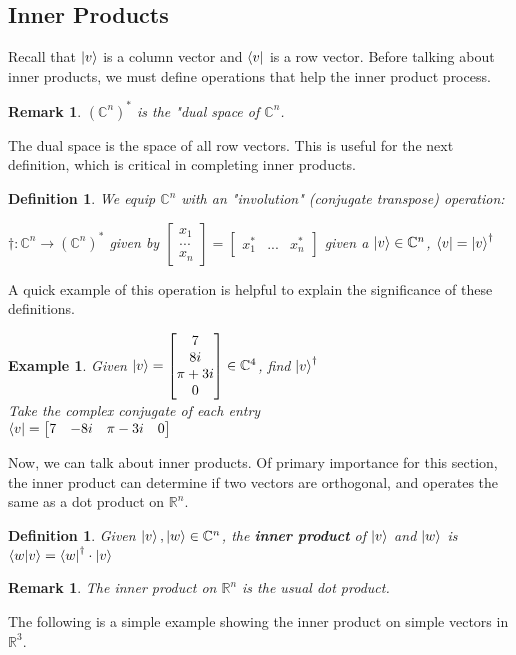 \documentclass[12pt]{article}
\theoremstyle{plain}
\theoremstyle{nonumberplain}
\theoremstyle{plain}
\newtheorem{definition}[lemma]{Definition}
\newtheorem{example}[lemma]{Example}
\newtheorem{remark}[lemma]{Remark}
\theoremstyle{nonumberplain}
\newcommand\1{{\bf 1}}
\newcommand{\bmat}[1]{\begin{bmatrix*} #1 \end{bmatrix*}} %
\newcommand{\R}{\mathbb{R}} %
\newcommand{\C}{\mathbb{C}} %
\newcommand{\<}{\left\langle}
\renewcommand{\>}{\right\rangle}
\begin{document}

\subsection{Inner Products}

Recall that $\ket{v}$ is a column vector and $\bra{v}$ is a row vector. Before talking about inner products, we must define operations that help the inner product process.
\begin{remark}
$(\C^n)^*$ is the "dual space of $\C^n$.
\end{remark}
The dual space is the space of all row vectors. This is useful for the next definition, which is critical in completing inner products.
\begin{definition}
We equip $\C^n$ with an "involution" (\textit{conjugate transpose}) operation:
\begin{center}
$\dagger:\C^n\longrightarrow(\C^n)^*$ given by $\bmat{x_1 \\ ... \\ x_n}=\bmat{x_1^* & ... & x_n^*}$ given a $\ket{v}\in\C^n$, $\bra{v}=\ket{v}^\dagger$
\end{center}
\end{definition}
A quick example of this operation is helpful to explain the significance of these definitions.
\begin{example}
Given $\ket{v}=\bmat{7 \\ 8i \\ \pi + 3i \\ 0}\in\C^4$, find $\ket{v}^\dagger$\\
Take the complex conjugate of each entry \\
$\bra{v}=\bmat{7 & -8i & \pi-3i & 0}$
\end{example}
Now, we can talk about inner products. Of primary importance for this section, the inner product can determine if two vectors are orthogonal, and operates the same as a dot product on $\R^n$.
\begin{definition}
Given $\ket{v}, \ket{w}\in\C^n$, the \textbf{inner product} of $\ket{v}$ and $\ket{w}$ is $\langle w|v \rangle=\bra{w}^\dagger\cdot\ket{v}$
\end{definition}
\begin{remark}
The inner product on $\R^n$ is the usual dot product.
\end{remark}
The following is a simple example showing the inner product on simple vectors in $\R^3$.
\end{document}
